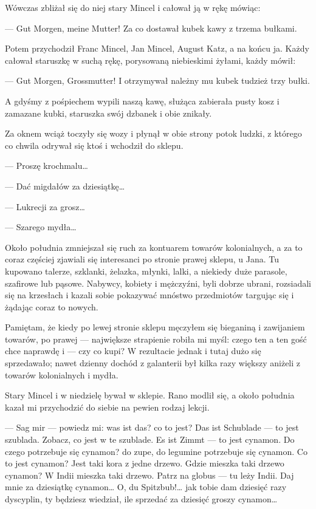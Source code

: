 \documentclass{book}
\begin{document}
Wówczas zbliżał się do niej stary Mincel i całował ją w rękę mówiąc:

— Gut Morgen, meine Mutter!
Za co dostawał kubek kawy z trzema bułkami.

Potem przychodził Franc Mincel, Jan Mincel, August Katz, a na końcu ja. Każdy całował staruszkę w suchą rękę, porysowaną niebieskimi żyłami, każdy mówił:

— Gut Morgen, Grossmutter!
I otrzymywał należny mu kubek tudzież trzy bułki.

A gdyśmy z pośpiechem wypili naszą kawę, służąca zabierała pusty kosz i zamazane kubki, staruszka swój dzbanek i obie znikały.

Za oknem wciąż toczyły się wozy i płynął w obie strony potok ludzki, z którego co chwila odrywał się ktoś i wchodził do sklepu.

— Proszę krochmalu…

— Dać migdałów za dziesiątkę…

— Lukrecji za grosz…

— Szarego mydła…

Około południa zmniejszał się ruch za kontuarem towarów kolonialnych, a za to coraz częściej zjawiali się interesanci po stronie prawej sklepu, u Jana. Tu kupowano talerze, szklanki, żelazka, młynki, lalki, a niekiedy duże parasole, szafirowe lub pąsowe. Nabywcy, kobiety i mężczyźni, byli dobrze ubrani, rozsiadali się na krzesłach i kazali sobie pokazywać mnóstwo przedmiotów targując się i żądając coraz to nowych.

Pamiętam, że kiedy po lewej stronie sklepu męczyłem się bieganiną i zawijaniem towarów, po prawej — największe strapienie robiła mi myśl: czego ten a ten gość chce naprawdę i — czy co kupi? W rezultacie jednak i tutaj dużo się sprzedawało; nawet dzienny dochód z galanterii był kilka razy większy aniżeli z towarów kolonialnych i mydła.

Stary Mincel i w niedzielę bywał w sklepie. Rano modlił się, a około południa kazał mi przychodzić do siebie na pewien rodzaj lekcji.

— Sag mir — powiedz mi: was ist das? co to jest? Das ist Schublade — to jest szublada. Zobacz, co jest w te szublade. Es ist Zimmt — to jest cynamon. Do czego potrzebuje się cynamon? do zupe, do legumine potrzebuje się cynamon. Co to jest cynamon? Jest taki kora z jedne drzewo. Gdzie mieszka taki drzewo cynamon? W Indii mieszka taki drzewo. Patrz na globus — tu leży Indii. Daj mnie za dziesiątkę cynamon… O, du Spitzbub!… jak tobie dam dziesięć razy dyscyplin, ty będziesz wiedział, ile sprzedać za dziesięć groszy cynamon…
\end{document}
